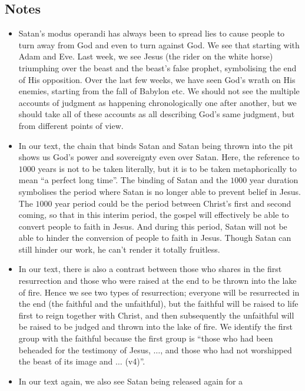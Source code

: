 \subsection*{Notes}
\begin{itemize}
  \item{Satan's modus operandi has always been to spread lies to cause people
  to turn away from God and even to turn against God.  We see that starting
  with Adam and Eve.  Last week, we see Jesus (the rider on the white horse)
  triumphing over the beast and the beast's false prophet, symbolising the
  end of His opposition.  Over the last few weeks, we have seen God's wrath
  on His enemies, starting from the fall of Babylon etc.  We should not see
  the multiple accounts of judgment as happening chronologically one after
  another, but we should take all of these accounts as all describing God's
  same judgment, but from different points of view.}
  \item{In our text, the chain that binds Satan and Satan being thrown into
  the pit shows us God's power and sovereignty even over Satan.  Here, the
  reference to $1000$ years is not to be taken literally, but it is to be
  taken metaphorically to mean ``a perfect long time''.  The binding of Satan
  and the $1000$ year duration symbolises the period where Satan is no longer
  able to prevent belief in Jesus.  The $1000$ year period could be the
  period between Christ's first and second coming, so that in this interim
  period, the gospel will effectively be able to convert people to faith in
  Jesus.  And during this period, Satan will not be able to hinder the
  conversion of people to faith in Jesus.  Though Satan can still hinder our
  work, he can't render it totally fruitless.}
  \item{In our text, there is also a contrast between those who shares in the
  first resurrection and those who were raised at the end to be thrown into
  the lake of fire.  Hence we see two types of resurrection; everyone will be
  resurrected in the end (the faithful and the unfaithful), but the faithful
  will be raised to life first to reign together with Christ, and then
  subsequently the unfaithful will be raised to be judged and thrown into the
  lake of fire.  We identify the first group with the faithful because the
  first group is ``those who had been beheaded for the testimony of Jesus,
  $\dots$, and those who had not worshipped the beast of its image and
  $\dots$ (v4)''.}
  \item{In our text again, we also see Satan being released again for a
}
\end{itemize}

